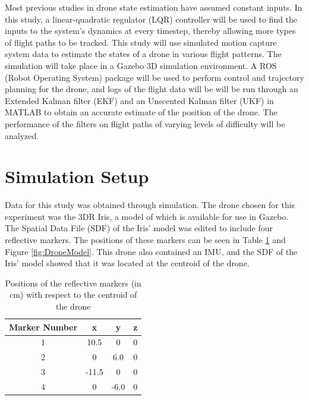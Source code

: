 \documentclass[letterpaper, paper,11pt]{AAS}	%
\begin{document}
Most previous studies in drone state estimation have assumed constant inputs. In this study, a linear-quadratic regulator (LQR) controller will be used to find the inputs to the system's dynamics at every timestep, thereby allowing more types of flight paths to be tracked. This study will use simulated motion capture system data to estimate the states of a drone in various flight patterns. The simulation will take place in a Gazebo 3D simulation environment\cite{gazebo}. A ROS (Robot Operating System)\cite{ros} package will be used to perform control and trajectory planning for the drone, and logs of the flight data will be will be run through an Extended Kalman filter (EKF) and an Unscented Kalman filter (UKF) in MATLAB to obtain an accurate estimate of the position of the drone. The performance of the filters on flight paths of varying levels of difficulty will be analyzed.


\section{Simulation Setup}

Data for this study was obtained through simulation. The drone chosen for this experiment was the 3DR Iris\cite{iris}, a model of which is available for use in Gazebo\cite{gazebo}. The Spatial Data File (SDF) of the Iris' model was edited to include four reflective markers. The positions of these markers can be seen in Table \ref{tab:DroneModel} and Figure \ref{fig:DroneModel}. This drone also contained an IMU, and the SDF of the Iris' model showed that it was located at the centroid of the drone.

\begin{table}[htbp]
	\fontsize{10}{10}\selectfont
    \caption{Positions of the reflective markers (in cm) with respect to the centroid of the drone}
   \label{tab:DroneModel}
        \centering 
   \begin{tabular}{c | c | c | c} %
      \hline 
      Marker Number    & x & y & z \\
      \hline 
      1      & 10.5 & 0 & 0 \\
      2      & 0 & 6.0 & 0 \\
      3      & -11.5 & 0 & 0 \\
      4      & 0 & -6.0 & 0 \\
      \hline
   \end{tabular}
\end{table}
\end{document}

